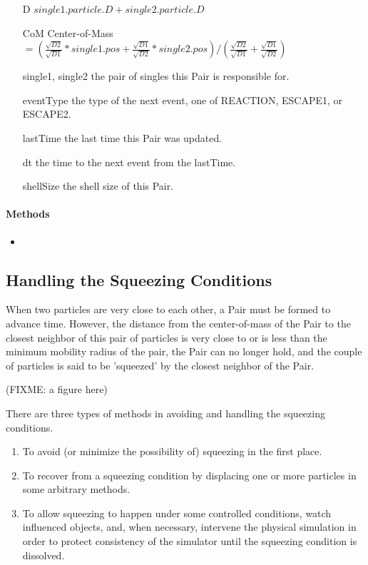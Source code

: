 \documentclass[english]{article}
\begin{document}
\begin{itemize}
\item[D] $single1.particle.D + single2.particle.D$


\item[CoM] Center-of-Mass  
  $= ( \frac{\sqrt{D2}}{\sqrt{D1}} * single1.pos +
  \frac{\sqrt{D1}}{\sqrt{D2}} * single2.pos ) / (
  \frac{\sqrt{D2}}{\sqrt{D1}}+\frac{\sqrt{D1}}{\sqrt{D2}})$

\item[single1, single2] the pair of singles this Pair is responsible for.


\item[eventType] the type of the next event, one of REACTION,
  ESCAPE1, or ESCAPE2.

\item[lastTime] the last time this Pair was updated.

\item[dt] the time to the next event from the lastTime.

\item[shellSize] the shell size of this Pair.

\end{itemize}

\paragraph{Methods}

\begin{itemize}
\item 
\end{itemize}


\subsection{Handling the Squeezing Conditions}

When two particles are very close to each other, a Pair must be formed
to advance time.  However, the distance from the center-of-mass of the
Pair to the closest neighbor of this pair of particles is very close
to or is less than the minimum mobility radius of the pair, the Pair
can no longer hold, and the couple of particles is said to be 'squeezed'
by the closest neighbor of the Pair.

(FIXME: a figure here)

There are three types of methods in avoiding and handling the squeezing
conditions.

\begin{enumerate}
\item To avoid (or minimize the possibility of) squeezing in the first place.

\item To recover from a squeezing condition by displacing one or more
  particles in some arbitrary methods.

\item To allow squeezing to happen under some controlled conditions,
  watch influenced objects, and, when necessary, intervene the
  physical simulation in order to protect consistency of the simulator
  until the squeezing condition is dissolved.
\end{enumerate}
\end{document}
